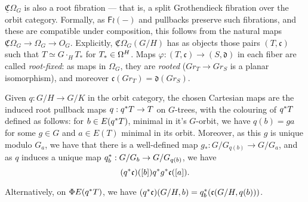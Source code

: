 \documentclass[a4paper,10pt
,draft
]{article}%
\renewcommand{\phi}{\varphi}
\begin{document}
\begin{remark}
      $\underline{\mathfrak C}\Omega_G$ is also a root fibration ---
      that is, a split Grothendieck fibration over the orbit category.
      Formally, as $\mathsf F \wr (-)$ and pullbacks preserve such fibrations, and these are compatible under composition,
      this follows from the natural maps $\underline{\mathfrak C}\Omega_G \to \Omega_G \to O_G$.
      Explicitly, $\underline{\mathfrak C}\Omega_G(G/H)$ has as objects those pairs $(T,\mathfrak c)$ such that
      $T \simeq G \cdot_H T_*$ for $T_{\**} \in \Omega^H$.
      Maps $\phi:(T,\mathfrak c) \to (S, \mathfrak d)$ in each fiber are called \textit{root-fixed}:
      as maps in $\Omega_G$, they are \textit{rooted} ($G r_T \to G r_S$ is a planar isomorphism),
      and moreover $\mathfrak c(Gr_T) = \mathfrak d(G r_S)$.
      
      Given $q: G/H \to G/K$ in the orbit category,
      the chosen Cartesian maps are the induced root pullback maps $q: q^{\**}T \to T$ on $G$-trees,
      with the colouring of $q^{\**}T$ defined as follows:
      for $b\in E(q^{\**}T)$, minimal in it's $G$-orbit, we have $q(b) = g a$ for some $g \in G$ and $a \in E(T)$ minimal in its orbit.
      Moreover, as this $g$ is unique modulo $G_a$, we have that there is a well-defined map $g_*: G/G_{q(b)} \to G/G_a$,
      and as $q$ induces a unique map $q_b^{\**}: G/G_b \to G/G_{q(b)}$, we have
      \begin{equation}
            (q^{\**}\mathfrak c)([b]) q^{\**}g^{\**}\mathfrak c([a]).
      \end{equation}

      {\color{blue} %
        Alternatively, on $\Phi E(q^{\**} T)$, we have
        $(q^{\**}\mathfrak c)(G/H, b) = q_b^{\**}(\mathfrak c(G/H, q(b)))$.
      } %
\end{remark}
\end{document}

